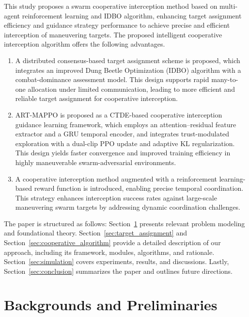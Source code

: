 \documentclass[lettersize,journal]{IEEEtran}
\begin{document}
This study proposes a swarm cooperative interception method based on multi-agent reinforcement
learning and IDBO algorithm, enhancing target assignment efficiency and guidance strategy
performance to achieve precise and efficient interception of maneuvering targets.
The proposed intelligent cooperative interception algorithm offers the following advantages.

\begin{enumerate}
\item A distributed consensus-based target assignment scheme is proposed, which integrates an
improved Dung Beetle Optimization (IDBO) algorithm with a combat-dominance assessment model.
This design supports rapid many-to-one allocation under limited communication, leading to more
efficient and reliable target assignment for cooperative interception.

\item ART-MAPPO is proposed as a CTDE-based cooperative interception guidance learning
framework, which employs an attention--residual feature extractor and a GRU temporal encoder,
and integrates trust-modulated exploration with a dual-clip PPO update and adaptive KL
regularization. This design yields faster convergence and improved training efficiency in
highly maneuverable swarm-adversarial environments.

\item A cooperative interception method augmented with a reinforcement learning-based reward
function is introduced, enabling precise temporal coordination. This strategy enhances
interception success rates against large-scale maneuvering swarm targets by addressing dynamic
coordination challenges.
\end{enumerate}

The paper is structured as follows: Section~\ref{sec:method} presents relevant problem modeling and foundational theory. Section~\ref{sec:target_assignment} and Section~\ref{sec:cooperative_algorithm} provide a detailed description of our approach, including its framework, modules, algorithms, and rationale. Section~\ref{sec:simulation} covers experiments, results, and discussions. Lastly, Section~\ref{sec:conclusion} summarizes the paper and outlines future directions.

\section{Backgrounds and Preliminaries}
\label{sec:method}
\end{document}
